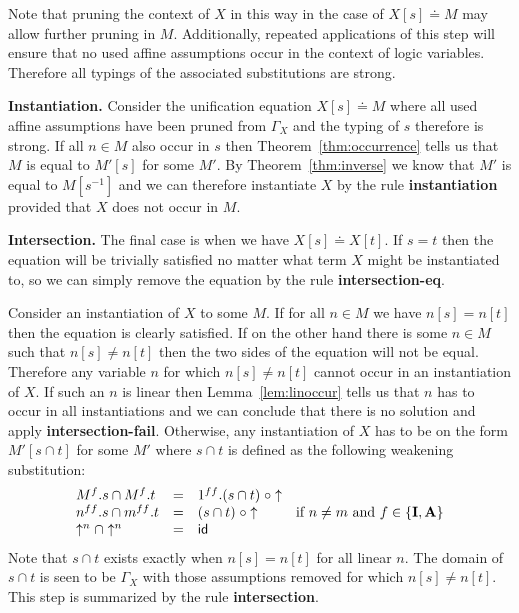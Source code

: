 \documentclass{eptcs}
\newcommand\fI{\textup{$\mathbf{I}$}}
\newcommand\fA{\textup{$\mathbf{A}$}}
\theoremstyle{definition}
\begin{document}
Note that pruning the context of $X$ in this way in the case of
$X[s]\doteq M$ may allow further pruning in $M$.  Additionally, repeated
applications of this step will ensure that no used affine assumptions
occur in the context of logic variables.  Therefore all
typings of the associated substitutions are strong.


\medskip \noindent\textbf{Instantiation.}
Consider the unification equation $X[s]\doteq M$ where all used affine assumptions have been
pruned from $\Gamma_X$ and the typing of $s$ therefore is strong.
If all $n\in M$ also occur in $s$ then
Theorem~\ref{thm:occurrence} tells us that $M$ is equal to
$M'[s]$ for some $M'$.  By Theorem~\ref{thm:inverse} we know that
$M'$ is equal to $M[s^{-1}]$ and we can therefore
instantiate $X$ by the rule \textbf{instantiation} provided that $X$
does not occur in $M$.

\medskip \noindent\textbf{Intersection.}
The final case is when we have $X[s]\doteq X[t]$.  If $s=t$ then the
equation will be trivially satisfied no matter what term $X$ might be
instantiated to, so we can simply remove the equation by the rule
\textbf{intersection-eq}.  

Consider an instantiation of $X$ to some $M$.  If for all
$n\in M$ we have $n[s]=n[t]$ then the equation is
clearly satisfied.  If on the other hand there is some $n\in M$ such
that $n[s]\neq n[t]$ then the two sides of the equation
will not be equal.  Therefore any variable $n$ for which
$n[s]\neq n[t]$ cannot occur in an instantiation of $X$.
If such an $n$ is linear then Lemma~\ref{lem:linoccur} tells us that
$n$ has to occur in all instantiations and we can conclude that there is
no solution and apply \textbf{intersection-fail}.
Otherwise, any instantiation of $X$ has to be on the form $M'[s\cap t]$ for some
$M'$ where $s\cap t$ is defined as the following weakening substitution:
\[
\begin{array}{llll}
M^{f}.s\cap M^{f}.t &=&
1^{ff}.(s\cap t)\;\circ \uparrow \\
n^{ff}.s\cap m^{ff}.t &=&
(s\cap t)\;\circ \uparrow & \textrm{if }n\neq m\textrm{ and }f\in\{\fI,\fA\} \\
\uparrow^n\cap \uparrow^n &=& \textsf{id} \\
\end{array}
\]
Note that $s\cap t$ exists exactly when $n[s]=n[t]$
for all linear $n$.  The domain of
$s\cap t$ is seen to be $\Gamma_X$ with those assumptions removed for which
$n[s]\neq n[t]$.
This step is summarized by the rule \textbf{intersection}.
\end{document}
